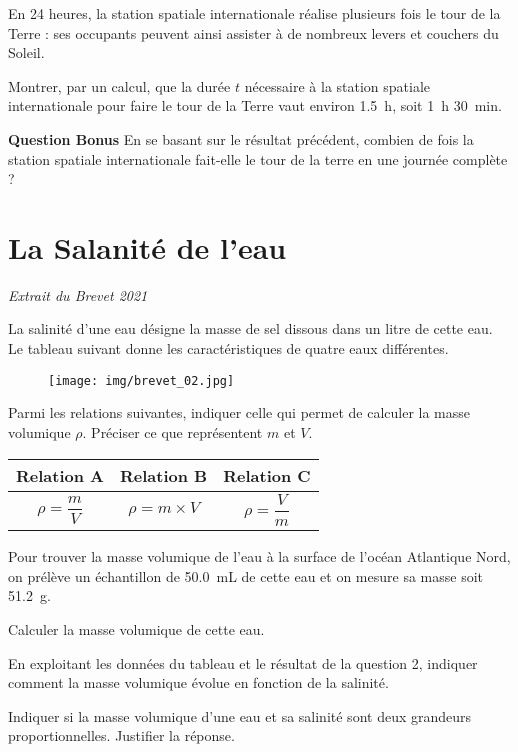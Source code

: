 \documentclass[answers]{exam}
\begin{document}
\begin{questions}
  En 24 heures, la station spatiale internationale réalise plusieurs fois le tour de la Terre : ses occupants peuvent ainsi assister à de nombreux levers et couchers du Soleil.
  
  Montrer, par un calcul, que la durée $t$ nécessaire à la station spatiale internationale pour faire le tour de la Terre vaut environ \SI{1.5}{\hour}, soit \SI{1}{\hour} \SI{30}{\minute}.
  
  \question[2] \textbf{Question Bonus} En se basant sur le résultat précédent, combien de fois la station spatiale internationale fait-elle le tour de la terre en une journée complète ?

\section*{La Salanité de l'eau}

\textit{Extrait du Brevet 2021}
\vspace{1em}

La salinité d’une eau désigne la masse de sel dissous dans un litre de cette eau.
Le tableau suivant donne les caractéristiques de quatre eaux différentes.

\begin{figure}[H]
  \centering
  \texttt{[image: img/brevet\_02.jpg]}
\end{figure}

  \question[3] Parmi les relations suivantes, indiquer celle qui permet de calculer la masse volumique $\rho$. Préciser ce que représentent $m$ et $V$.

  \begin{center}
    \renewcommand{\arraystretch}{2} %
    \setlength{\tabcolsep}{20pt}   %
    \begin{tabular}{|c|c|c|}
    \hline
    Relation A & Relation B & Relation C \\
    \hline
    $\rho = \dfrac{m}{V}$ & $\rho = m \times V$ & $\rho = \dfrac{V}{m}$ \\
    \hline
    \end{tabular}
    \end{center}
  
  Pour trouver la masse volumique de l’eau à la surface de l’océan Atlantique Nord, on prélève un échantillon de \SI{50.0}{\milli\liter} de cette eau et on mesure sa masse soit \SI{51.2}{\gram}.
  
  \question[4] Calculer la masse volumique de cette eau.
  
  \question[2] En exploitant les données du tableau et le résultat de la question 2, indiquer comment la masse volumique évolue en fonction de la salinité.
  
  \question[2] Indiquer si la masse volumique d’une eau et sa salinité sont deux grandeurs proportionnelles. Justifier la réponse.


  \end{questions}
\end{document}
